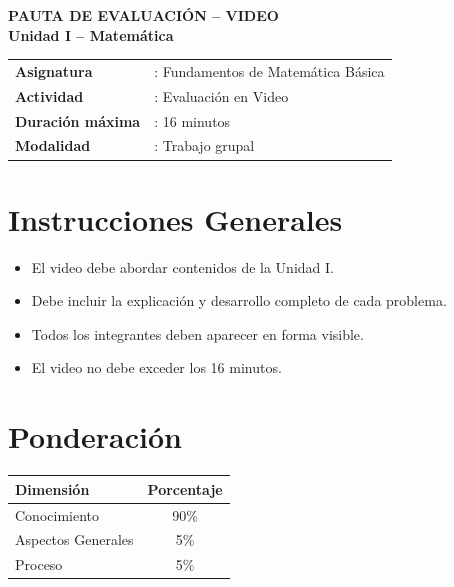 \documentclass[12pt]{article}
\begin{document}
	
	\begin{center}
		{\Large \textbf{\color{USTBlue}PAUTA DE EVALUACIÓN -- VIDEO}}\\[0.3cm]
		{\normalsize \textbf{Unidad I -- Matemática}}\\[0.5cm]
	\end{center}
	
	\vspace{0.3cm}
	
	\noindent
	\begin{tabular}{p{5cm} p{10cm}}
		\textbf{Asignatura} & : Fundamentos de Matemática Básica \\
		\textbf{Actividad} & : Evaluación en Video \\
		\textbf{Duración máxima} & : 16 minutos \\
		\textbf{Modalidad} & : Trabajo grupal \\
	\end{tabular}
	
	\vspace{0.4cm}
	
	\section*{Instrucciones Generales}
	
	\begin{itemize}
		\item El video debe abordar contenidos de la Unidad I.
		\item Debe incluir la explicación y desarrollo completo de cada problema.
		\item Todos los integrantes deben aparecer en forma visible.
		\item El video no debe exceder los 16 minutos.
	\end{itemize}
	
	\section*{Ponderación}
	
	\begin{center}
		\begin{tabular}{lc}
			\toprule
			\textbf{Dimensión} & \textbf{Porcentaje} \\
			\midrule
			Conocimiento & 90\% \\
			Aspectos Generales & 5\% \\
			Proceso & 5\% \\
			\bottomrule
		\end{tabular}
	\end{center}
	
\end{document}
